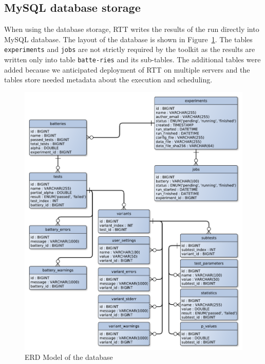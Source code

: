\documentclass[
	digital,    %
	oneside,    %
	color,
	11pt,
	nocover,
	notable,
	nolof,
	nolot,
]{fithesis3}
\theoremstyle{definition}
\theoremstyle{remark}
\begin{document}
\subsection{MySQL database storage}
\label{sec:mysql_res_storage}
When using the database storage, RTT writes the results of the run directly into MySQL database. The layout of the database is shown in Figure~\ref{fig:erd_database}. The tables \texttt{experiments} and \texttt{jobs} are not strictly required by the toolkit as the results are written only into table \texttt{batte-\newline ries} and its sub-tables. The additional tables were added because we anticipated deployment of RTT on multiple servers and the tables store needed metadata about the execution and scheduling.

\begin{figure}[h!]
\begin{nomar}
\centering
\includegraphics[width=\paperwidth-3.5cm]{figures/database-erd-model.pdf}
\end{nomar}
\caption{ERD Model of the database}
\label{fig:erd_database}
\end{figure}
\end{document}
